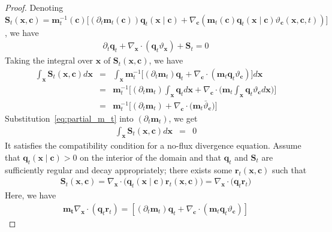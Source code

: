 \documentclass{article} %
\begin{document}
\begin{proof}
Denoting $\mathbf{S}_t(\mathbf{x}, \mathbf{c}) = \mathbf{m}^{-1}_t(\mathbf{c}) \big[ (\partial_t  \mathbf{m}_t (\mathbf{c}))\mathbf{q}_t(\mathbf{x} \mid \mathbf{c}) + \nabla_{\mathbf{c}} (\mathbf{m}_t (\mathbf{c})\mathbf{q}_t (\mathbf{x} \mid \mathbf{c}) \vartheta_{\mathbf{c}}(\mathbf{x}, \mathbf{c}, t))\big]$, we have 
\begin{eqnarray}
    \partial_t \mathbf{q}_t + \nabla_{\mathbf{x}} \cdot (\mathbf{q}_t \vartheta_{\mathbf{x}})  + \mathbf{S}_t = 0 \label{eq:before_s}
\end{eqnarray}
Taking the integral over $\mathbf{x}$ of $\mathbf{S}_t(\mathbf{x}, \mathbf{c})$, we have 
\begin{eqnarray}
   \int_{\mathbf{x}} \mathbf{S}_t(\mathbf{x}, \mathbf{c}) d \mathbf{x} &=& \int_{\mathbf{x}} \mathbf{m}^{-1}_t \big[ (\partial_t  \mathbf{m}_t)\mathbf{q}_t + \nabla_{\mathbf{c}} \cdot(\mathbf{m}_t\mathbf{q}_t  \vartheta_{\mathbf{c}})] d\mathbf{x} \\ \nonumber
   &=& \mathbf{m}^{-1}_t  \Big[ (\partial_t  \mathbf{m}_t)\int_{\mathbf{x}}\mathbf{q}_t d\mathbf{x} + \nabla_{\mathbf{c}} \cdot \Big(\mathbf{m}_t \int_{\mathbf{x}} \mathbf{q}_t \vartheta_{\mathbf{c}} d\mathbf{x} \Big) \Big] \\
   &=& \mathbf{m}^{-1}_t  \Big[ (\partial_t  \mathbf{m}_t) + \nabla_{\mathbf{c}} \cdot \big(\mathbf{m}_t \bar{\vartheta}_{\mathbf{c}} \big) \Big]
\end{eqnarray}
Substitution~\eqref{eq:partial_m_t} into $(\partial_t  \mathbf{m}_t)$, we get
\begin{eqnarray}
  \int_{\mathbf{x}} \mathbf{S}_t (\mathbf{x}, \mathbf{c}) d \mathbf{x} &=& 0
\end{eqnarray}
It satisfies the compatibility condition for a no-flux divergence equation.
Assume that \(\mathbf{q}_t(\mathbf{x}\mid\mathbf{c})>0\) on the interior of the domain and that \(\mathbf{q}_t\) and \(\mathbf{S}_t\) are sufficiently regular and decay appropriately; there exists some $\mathbf{r}_t(\mathbf{x}, \mathbf{c})$ such that  
\begin{eqnarray}
    \mathbf{S}_t (\mathbf{x}, \mathbf{c}) = \nabla_{\mathbf{x}} \cdot \big(\mathbf{q}_t (\mathbf{x} \mid \mathbf{c}) \mathbf{r}_t (\mathbf{x}, \mathbf{c})\big) = \nabla_{\mathbf{x}}\cdot\big(\mathbf{q}_t \mathbf{r}_t \big) 
\end{eqnarray}
Here, we have 
\begin{eqnarray}
    \mathbf{m_t}\nabla_{\mathbf{x}} \cdot (\mathbf{q}_t \mathbf{r}_t) = [(\partial_t \mathbf{m}_t) \mathbf{q}_t + \nabla_{\mathbf{c}} \cdot (\mathbf{m}_t\mathbf{q}_t \vartheta_{\mathbf{c}})] \label{eq:define_r}

\end{eqnarray}
\end{proof}
\end{document}
